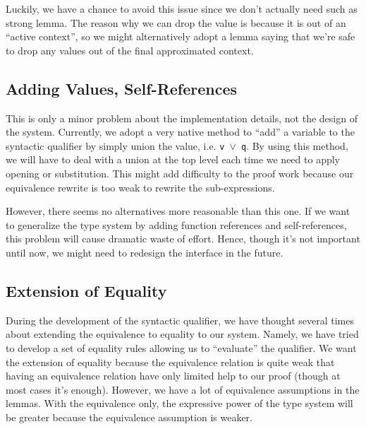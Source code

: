 Luckily, we have a chance to avoid this issue since we don't actually need such as strong lemma. The reason why we can drop the value is because it is out of an ``active context'', so we might alternatively adopt a lemma saying that we're safe to drop any values out of the final approximated context.  

\subsection{Adding Values, Self-References} 
This is only a minor problem about the implementation details, not the design of the system. Currently, we adopt a very native method to ``add'' a variable to the syntactic qualifier by simply union the value, i.e. \texttt{v $\lor$ q}. By using this method, we will have to deal with a union at the top level each time we need to apply opening or substitution. This might add difficulty to the proof work because our equivalence rewrite is too weak to rewrite the sub-expressions.

However, there seems no alternatives more reasonable than this one. If we want to generalize the \langstar type system by adding function references and self-references, this problem will cause dramatic waste of effort. Hence, though it's not important until now, we might need to redesign the interface in the future.

\subsection{Extension of Equality}
During the development of the syntactic qualifier, we have thought several times about extending the equivalence to equality to our system. Namely, we have tried to develop a set of equality rules allowing us to ``evaluate'' the qualifier. We want the extension of equality because the equivalence relation is quite weak that having an equivalence relation have only limited help to our proof (though at most cases it's enough). However, we have a lot of equivalence assumptions in the lemmas. With the equivalence only, the expressive power of the type system will be greater because the equivalence assumption is weaker.



